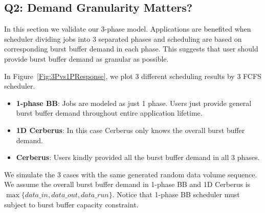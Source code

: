 \subsection{Q2: Demand Granularity Matters?}
In this section we validate our 3-phase model.
Applications are benefited when scheduler dividing jobs into 3 separated phases and 
scheduling are based on corresponding burst buffer demand in each phase.
This suggests that user should provide burst buffer demand as granular as possible.

In Figure~\ref{Fig:3Pvs1PResponse}, we plot 3 different scheduling results by 3 FCFS scheduler.
\begin{itemize}
        \item \textbf{1-phase BB}: Jobs are modeled as just 1 phase.
                Users just provide general burst buffer demand throughout
                entire application lifetime.
        \item \textbf{1D Cerberus}: In this case Cerberus only knows
                the overall burst buffer demand.
        \item \textbf{Cerberus}: Users kindly provided all the burst buffer
                demand in all 3 phases.
\end{itemize}
We simulate the 3 cases with the same generated random data volume sequence.
We assume the overall burst buffer demand in 1-phase BB and 1D Cerberus is
$\max \{data\_in, data\_out, data\_run\}$.
Notice that 1-phase BB scheduler must subject to burst buffer capacity constraint.

